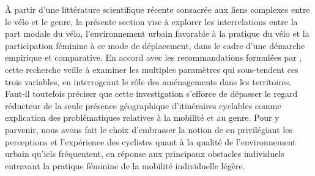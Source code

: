 \begin{refsegment}
À partir d'une littérature scientifique récente consacrée aux liens complexes entre le vélo et le genre, la présente section vise à explorer les interrelations entre la part modale du vélo, l'environnement urbain favorable à la pratique du vélo et la participation féminine à ce mode de déplacement, dans le cadre d'une démarche empirique et comparative. En accord avec les recommandations formulées par \textcolor{blue}{\textcite[78]{goel_cycling_2022}}, cette recherche veille à examiner les multiples paramètres qui sous-tendent ces trois variables, en interrogeant le rôle des aménagements dans les territoires. Faut-il toutefois préciser que cette investigation s'efforce de dépasser le regard réducteur de la seule présence géographique d'itinéraires cyclables comme explication des problématiques relatives à la mobilité et au genre. Pour y parvenir, nous avons fait le choix d'embrasser la notion de  en privilégiant les perceptions et l'expérience des cyclistes quant à la qualité de l'environnement urbain qu'iels fréquentent, en réponse aux principaux obstacles individuels entravant la pratique féminine de la mobilité individuelle légère.%


\end{refsegment}
